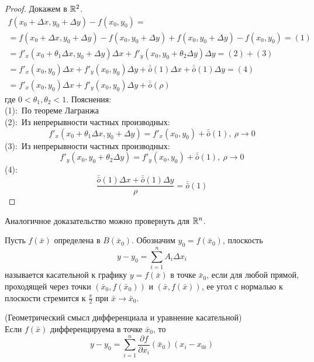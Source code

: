 \begin{proof}
    Докажем в $\mathbb{R}^2$.
    \begin{multline*}
        f(x_0+\Delta x, y_0+\Delta y)-f(x_0, y_0)=\\
        =f(x_0+\Delta x, y_0+\Delta y)-f(x_0, y_0+\Delta y)+f(x_0, y_0+\Delta y)-f(x_0, y_0)= (1)\\
        =f'_x(x_0+\theta_1 \Delta x, y_0+\Delta y)\Delta x+f'_y(x_0,y_0+\theta_2 \Delta y) \Delta y= (2)+(3)\\
        =f'_x(x_0,y_0)\Delta x+f'_y(x_0,y_0)\Delta y+\bar{\bar{o}}{(1)}\Delta x+\bar{\bar{o}}{(1)} \Delta y= (4)\\
        =f'_x(x_0,y_0)\Delta x+f'_y(x_0,y_0)\Delta y+\bar{\bar{o}}{(\rho)}
    \end{multline*}
    где $0 < \theta_1, \theta_2 < 1$. Пояснения:\\
    (1):\ По теореме Лагранжа\\
    (2):\ Из непрерывности частных производных:
    \[f'_x(x_0+\theta_1 \Delta x, y_0+\Delta y)=f'_x(x_0,y_0)+\bar{\bar{o}}{(1)},\ \rho \to 0\]
    (3):\ Из непрерывности частных производных:
    \[f'_y(x_0, y_0+\theta_2 \Delta y)=f'_y(x_0,y_0)+\bar{\bar{o}}{(1)},\ \rho \to 0\]
    (4):\ \[\frac{\bar{\bar{o}}{(1)}\Delta x+\bar{\bar{o}}{(1)} \Delta y}{\rho}=\bar{\bar{o}}{(1)}\]
\end{proof} 
\begin{comm}
    Аналогичное доказательство можно провернуть для $\mathbb{R}^n$.
\end{comm}
\begin{definition}
    Пусть $f(\bar{x})$ определена в $B(\bar{x}_0)$. Обозначим $y_0=f(\bar{x}_0)$, плоскость
    \[y-y_0=\sum\limits_{i=1}^{n}A_i \Delta x_i\]
    называется касательной к графику $y=f(\bar{x})$ в точке $\bar{x}_0$, если для любой прямой, проходящей через точки $(\bar{x}_0, f(\bar{x}_0))$ и $(\bar{x}, f(\bar{x}))$, ее угол с нормалью к плоскости стремится к $\frac{\pi}{2}$ при $\bar{x}\to \bar{x}_0$.
\end{definition} 
\begin{theorem} (Геометрический смысл дифференциала и уравнение касательной)\\
    Если $f(\bar{x})$ дифференцируема в точке $\bar{x}_0$, то 
    \[y-y_0=\sum\limits_{i=1}^{n}\frac{\partial {f}}{\partial {x_i}}(\bar{x}_0)(x_i-x_{0i})\]
\end{theorem} 
